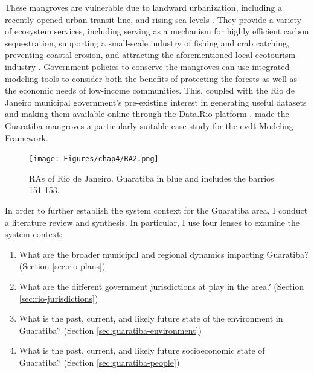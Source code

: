 These mangroves are vulnerable due to landward urbanization, including a recently opened urban transit line, and rising sea levels \cite{goldbergEcoMapDecisionsupportTool2018}. They provide a variety of ecosystem services, including serving as a mechanism for highly efficient carbon sequestration, supporting a small-scale industry of fishing and crab catching, preventing coastal erosion, and attracting the aforementioned local ecotourism industry \cite{schwenkResearchEnvironmentalSocioeconomical2008}. Government policies to conserve the mangroves can use integrated modeling tools to consider both the benefits of protecting the forests as well as the economic needs of low-income communities. This, coupled with the Rio de Janeiro municipal government's pre-existing interest in generating useful datasets and making them available online through the Data.Rio platform \cite{matheusOpenGovernmentData2014}, made the Guaratiba mangroves a particularly suitable case study for the \ac{evdt} Modeling Framework.

\begin{figure}[!htb]
	\centering
	\texttt{[image: Figures/chap4/RA2.png]}
	\caption{RAs of Rio de Janeiro. Guaratiba in blue and includes the barrios 151-153.}
	\label{fig:ras}
\end{figure}

In order to further establish the system context for the Guaratiba area, I conduct a literature review and synthesis. In particular, I use four lenses to examine the system context:

\begin{enumerate} \setlength{\itemsep}{0pt} \setlength{\parskip}{0pt}
    \item What are the broader municipal and regional dynamics impacting Guaratiba? (Section \ref{sec:rio-plans})
    \item What are the different government jurisdictions at play in the area? (Section \ref{sec:rio-jurisdictions})
    \item What is the past, current, and likely future state of the environment in Guaratiba? (Section \ref{sec:guaratiba-environment})
    \item What is the past, current, and likely future socioeconomic state of Guaratiba? (Section \ref{sec:guaratiba-people})
\end{enumerate}

\subsubsection{}

